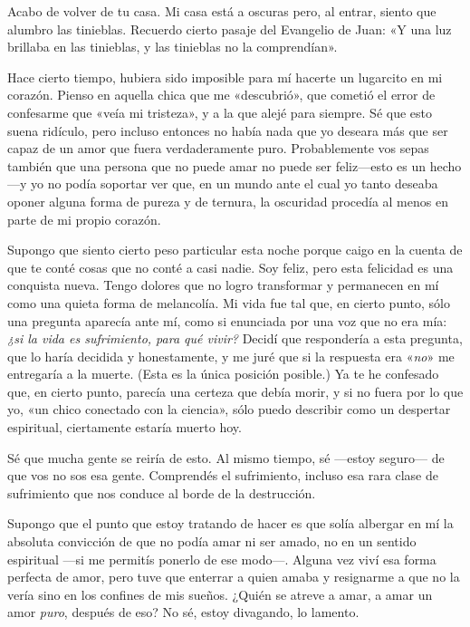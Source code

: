 \documentclass[a4paper]{article}
\begin{document}
Acabo de volver de tu casa. Mi casa está a oscuras pero, al entrar, siento que
alumbro las tinieblas. Recuerdo cierto pasaje del Evangelio de Juan: «Y una luz
brillaba en las tinieblas, y las tinieblas no la comprendían». 

Hace cierto tiempo, hubiera sido imposible para mí hacerte un lugarcito
en mi corazón. Pienso en aquella chica que me «descubrió», que cometió el
error de confesarme que «veía mi tristeza», y a la que alejé para siempre. Sé
que esto suena ridículo, pero incluso entonces no había nada que yo deseara más
que ser capaz de un amor que fuera verdaderamente puro. Probablemente vos sepas
también que una persona que no puede amar no puede ser feliz---esto es un
hecho---y yo no podía soportar ver que, en un mundo ante el cual yo tanto
deseaba oponer alguna forma de pureza y de ternura, la oscuridad procedía al
menos en parte de mi propio corazón.

Supongo que siento cierto peso particular esta noche porque caigo en la cuenta
de que te conté cosas que no conté a casi nadie. Soy feliz, pero esta
felicidad es una conquista nueva. Tengo dolores que no logro transformar y
permanecen en mí como una quieta forma de melancolía. Mi vida fue tal que, en
cierto punto, sólo una pregunta aparecía ante mí, como si enunciada por una voz
que no era mía: \textit{¿si la vida es sufrimiento, para qué vivir?} Decidí que respondería
a esta pregunta, que lo haría decidida y honestamente, y me juré que si la
respuesta era «\textit{no}» me entregaría a la muerte. (Esta es la única posición
posible.) Ya te he confesado que, en cierto punto, parecía una certeza que debía
morir, y si no fuera por lo que yo, «un chico conectado con la ciencia», sólo
puedo describir como un despertar espiritual, ciertamente estaría muerto hoy.

Sé que mucha gente se reiría de esto. Al mismo tiempo, sé ---estoy seguro--- de
que vos no sos esa gente. Comprendés el sufrimiento, incluso esa rara clase de
sufrimiento que nos conduce al borde de la destrucción.

Supongo que el punto que estoy tratando de hacer es que solía albergar en mí la
absoluta convicción de que no podía amar ni ser amado, no en un sentido
espiritual ---si me permitís ponerlo de ese modo---. Alguna vez viví esa forma
perfecta de amor, pero tuve que enterrar a quien amaba y resignarme a que no la
vería sino en los confines de mis sueños. ¿Quién se atreve a amar, a amar un
amor \textit{puro}, después de eso? No sé, estoy divagando, lo lamento.
\end{document}
